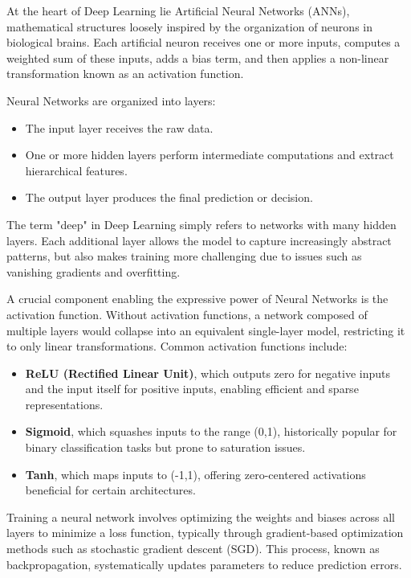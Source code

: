 \documentclass[openany]{book}
\begin{document}
At the heart of Deep Learning lie Artificial Neural Networks (ANNs), 
mathematical structures loosely inspired by the organization of neurons in 
biological brains. Each artificial neuron receives one or more inputs, computes 
a weighted sum of these inputs, adds a bias term, and then applies a non-linear 
transformation known as an activation function.

Neural Networks are organized into layers:

\begin{itemize}
    \item The input layer receives the raw data.
    \item One or more hidden layers perform intermediate computations and 
    extract hierarchical features.
    \item The output layer produces the final prediction or decision.
\end{itemize}

The term "deep" in Deep Learning simply refers to networks with many hidden 
layers. Each additional layer allows the model to capture increasingly abstract 
patterns, but also makes training more challenging due to issues such as 
vanishing gradients and overfitting.

A crucial component enabling the expressive power of Neural Networks is the 
activation function. Without activation functions, a network composed of 
multiple layers would collapse into an equivalent single-layer model, 
restricting it to only linear transformations. Common activation functions 
include:

\begin{itemize}
    \item \textbf{ReLU (Rectified Linear Unit)}, which outputs zero for 
    negative inputs and the input itself for positive inputs, enabling efficient 
    and sparse representations.
    \item \textbf{Sigmoid}, which squashes inputs to the range (0,1), 
    historically popular for binary classification tasks but prone to saturation 
    issues.
    \item \textbf{Tanh}, which maps inputs to (-1,1), offering zero-centered 
    activations beneficial for certain architectures.
\end{itemize}

Training a neural network involves optimizing the weights and biases across all 
layers to minimize a loss function, typically through gradient-based 
optimization methods such as stochastic gradient descent (SGD). This process, 
known as backpropagation, systematically updates parameters to reduce prediction
errors.
\end{document}
